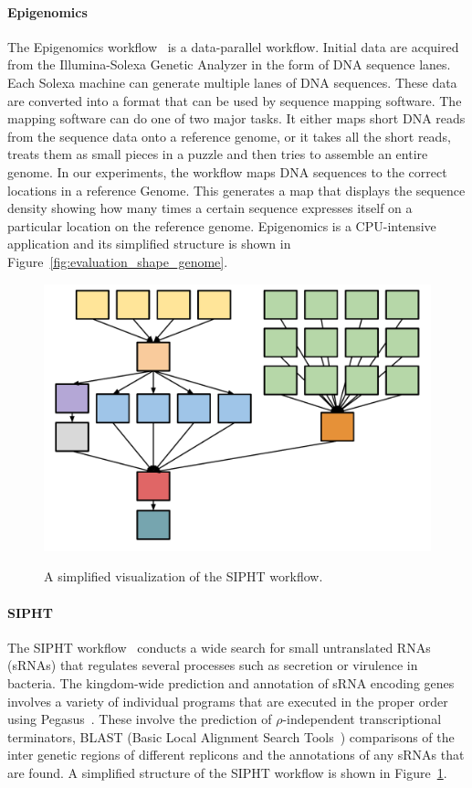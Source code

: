 \documentclass{IOS-Book-Article}
\begin{document}
\paragraph{\textbf{Epigenomics}}
The Epigenomics workflow~\cite{Epigenome} is a data-parallel workflow. Initial data are acquired from the Illumina-Solexa Genetic Analyzer in the form of DNA sequence lanes. Each Solexa machine can generate multiple lanes of DNA sequences. These data are converted into a format that can be used by sequence mapping software. The mapping software can do one of two major tasks. It either maps short DNA reads from the sequence data onto a reference genome, or it takes all the short reads, treats them as small pieces in a puzzle and then tries to assemble an entire genome. In our experiments, the workflow maps DNA sequences to the correct locations in a reference Genome. This generates a map that displays the sequence density showing how many times a certain sequence expresses itself on a particular location on the reference genome. Epigenomics is a CPU-intensive application and its simplified structure is shown in Figure~\ref{fig:evaluation_shape_genome}. 

\begin{figure}[htb]
	\centering
	\includegraphics[width=0.6\linewidth]{sipht_shape.pdf} \\
	\caption{A simplified visualization of the SIPHT workflow.}
	\label{fig:evaluation_shape_sipht}
\end{figure}

\paragraph{\textbf{SIPHT}}
The SIPHT workflow~\cite{SIPHT} conducts a wide search for small untranslated RNAs (sRNAs) that regulates several processes such as secretion or virulence in bacteria. The kingdom-wide prediction and annotation of sRNA encoding genes involves a variety of individual programs that are executed in the proper order using Pegasus~\cite{Deelman2004}. These involve the prediction of $\rho$-independent transcriptional terminators, BLAST (Basic Local Alignment Search Tools~\cite{BLAST}) comparisons of the inter genetic regions of different replicons and the annotations of any sRNAs that are found. A simplified structure of the SIPHT workflow is shown in Figure~\ref{fig:evaluation_shape_sipht}. 
\end{document}
